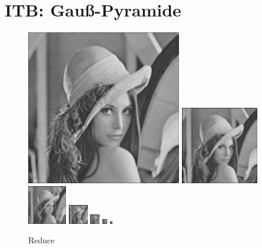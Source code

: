 \setcounter{section}{5}
\section{ITB: Gauß-Pyramide}
\begin{figure}
	\includegraphics[]{A6/1.jpg}
	\includegraphics[]{A6/2.jpg}
	\includegraphics[]{A6/3.jpg}
	\includegraphics[]{A6/4.jpg}
	\includegraphics[]{A6/5.jpg}
	\includegraphics[]{A6/6.jpg}
	\includegraphics[]{A6/7.jpg}
	\caption{Reduce}
\end{figure}

